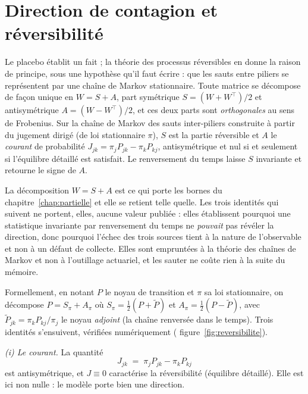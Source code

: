 
\section{Direction de contagion et réversibilité}

Le placebo établit un fait ; la théorie des processus réversibles en donne la raison de principe,
sous une hypothèse qu'il faut écrire : que les sauts entre piliers se représentent par une chaîne
de Markov stationnaire. Toute matrice se décompose de façon unique en $W=S+A$, part
symétrique $S=(W+W^\top)/2$ et antisymétrique $A=(W-W^\top)/2$, et ces deux parts sont
\emph{orthogonales} au sens de Frobenius. Sur la chaîne de Markov des sauts inter-piliers construite à partir
du jugement dirigé (de loi stationnaire $\pi$), $S$ est la partie réversible et $A$ le
\emph{courant} de probabilité $J_{jk}=\pi_j P_{jk}-\pi_k P_{kj}$, antisymétrique et nul si et
seulement si l'équilibre détaillé est satisfait. Le renversement du temps laisse $S$ invariante
et retourne le signe de $A$.

La décomposition $W=S+A$ est ce qui porte les bornes du chapitre~\ref{chap:partielle} et elle se
retient telle quelle. Les trois identités qui suivent ne portent, elles, aucune valeur publiée :
elles établissent pourquoi une statistique invariante par renversement du temps ne \emph{pouvait}
pas révéler la direction, donc pourquoi l'échec des trois sources tient à la nature de
l'observable et non à un défaut de collecte. Elles sont empruntées à la théorie des chaînes de
Markov et non à l'outillage actuariel, et les sauter ne coûte rien à la suite du mémoire.

Formellement, en notant $P$ le noyau de transition et $\pi$ sa loi stationnaire, on décompose
$P = S_\pi + A_\pi$ où $S_\pi=\tfrac12(P+\tilde P)$ et $A_\pi=\tfrac12(P-\tilde P)$, avec
$\tilde P_{jk} = \pi_k P_{kj}/\pi_j$ le noyau \emph{adjoint} (la chaîne renversée dans le temps).
Trois identités s'ensuivent, vérifiées numériquement (%
figure~\ref{fig:reversibilite}).

\emph{(i) Le courant.} La quantité
\begin{equation}
  J_{jk} \;=\; \pi_j P_{jk} - \pi_k P_{kj}
  \label{eq:courant}
\end{equation}
est antisymétrique, et $J\equiv 0$ caractérise la réversibilité (équilibre détaillé). Elle est
ici non nulle : le modèle porte bien une direction.

